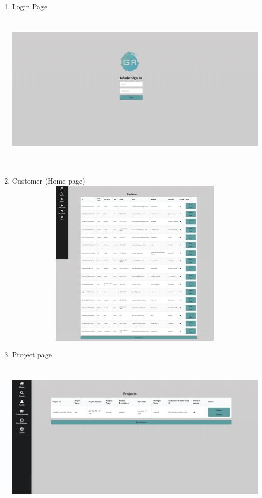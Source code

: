 \documentclass[onecolumn, draftclsnofoot,10pt, compsoc]{IEEEtran}
\begin{document}
\begin{enumerate}
  \item Login Page \newline\newline
\includegraphics[width=13cm, height=8cm]{web-login.png} \newline
  \item Customer (Home page)\newline\newline
\includegraphics[width=13cm, height=8cm]{web-Customer-home.png}\newline
\newpage
    \item Project page\newline\newline
\includegraphics[width=13cm, height=8cm]{web-project.png}\newline


\end{enumerate}
\end{document}
